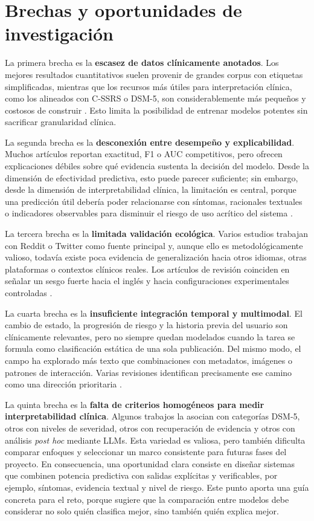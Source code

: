 \section{Brechas y oportunidades de investigación}

La primera brecha es la \textbf{escasez de datos clínicamente anotados}. Los mejores resultados cuantitativos suelen provenir de grandes corpus con etiquetas simplificadas, mientras que los recursos más útiles para interpretación clínica, como los alineados con C-SSRS o DSM-5, son considerablemente más pequeños y costosos de construir \citep{gaur2019severity, bao2025redsm5}. Esto limita la posibilidad de entrenar modelos potentes sin sacrificar granularidad clínica.

La segunda brecha es la \textbf{desconexión entre desempeño y explicabilidad}. Muchos artículos reportan exactitud, F1 o AUC competitivos, pero ofrecen explicaciones débiles sobre qué evidencia sustenta la decisión del modelo. Desde la dimensión de efectividad predictiva, esto puede parecer suficiente; sin embargo, desde la dimensión de interpretabilidad clínica, la limitación es central, porque una predicción útil debería poder relacionarse con síntomas, racionales textuales o indicadores observables para disminuir el riesgo de uso acrítico del sistema \citep{montejo2024survey, mirtaheri2024tcn, shuvo2024bigru}.

La tercera brecha es la \textbf{limitada validación ecológica}. Varios estudios trabajan con Reddit o Twitter como fuente principal y, aunque ello es metodológicamente valioso, todavía existe poca evidencia de generalización hacia otros idiomas, otras plataformas o contextos clínicos reales. Los artículos de revisión coinciden en señalar un sesgo fuerte hacia el inglés y hacia configuraciones experimentales controladas \citep{abdulsalam2024suicidal, montejo2024survey}.

La cuarta brecha es la \textbf{insuficiente integración temporal y multimodal}. El cambio de estado, la progresión de riesgo y la historia previa del usuario son clínicamente relevantes, pero no siempre quedan modelados cuando la tarea se formula como clasificación estática de una sola publicación. Del mismo modo, el campo ha explorado más texto que combinaciones con metadatos, imágenes o patrones de interacción. Varias revisiones identifican precisamente ese camino como una dirección prioritaria \citep{dechoudhury2016shifts, chatterjee2022multimodal, montejo2024survey}.

La quinta brecha es la \textbf{falta de criterios homogéneos para medir interpretabilidad clínica}. Algunos trabajos la asocian con categorías DSM-5, otros con niveles de severidad, otros con recuperación de evidencia y otros con análisis \textit{post hoc} mediante LLMs. Esta variedad es valiosa, pero también dificulta comparar enfoques y seleccionar un marco consistente para futuras fases del proyecto. En consecuencia, una oportunidad clara consiste en diseñar sistemas que combinen potencia predictiva con salidas explícitas y verificables, por ejemplo, síntomas, evidencia textual y nivel de riesgo. Este punto aporta una guía concreta para el reto, porque sugiere que la comparación entre modelos debe considerar no solo quién clasifica mejor, sino también quién explica mejor.
